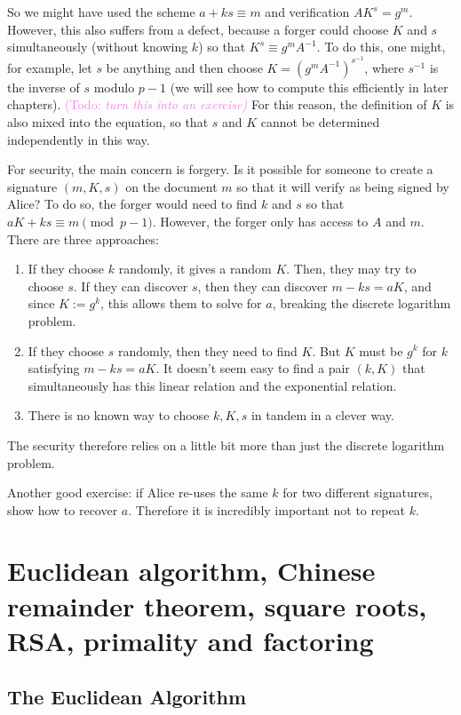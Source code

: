 \documentclass{article}
\theoremstyle{plain}
\theoremstyle{definition}
\theoremstyle{remark}
\numberwithin{theorem}{section}
\newcommand{\KS}[1]{\textcolor{violet}{{\sf (Todo:} {\sl{#1})}}}
\newcommand{\KS}[1]{}
\begin{document}
      So we might have used the scheme $a + ks \equiv m$ and verification $AK^s = g^m$.  However, this also suffers from a defect, because a forger could choose $K$ and $s$ simultaneously (without knowing $k$) so that $K^s \equiv g^mA^{-1}$.  To do this, one might, for example, let $s$ be anything and then choose $K = (g^mA^{-1})^{s^{-1}}$, where $s^{-1}$ is the inverse of $s$ modulo $p-1$ (we will see how to compute this efficiently in later chapters). \KS{turn this into an exercise}  For this reason, the definition of $K$ is also mixed into the equation, so that $s$ and $K$ cannot be determined independently in this way.

      For security, the main concern is forgery.  Is it possible for someone to create a signature $(m,K,s)$ on the document $m$ so that it will verify as being signed by Alice?  To do so, the forger would need to find $k$ and $s$ so that $aK+ks \equiv m \pmod{p-1}$.  However, the forger only has access to $A$ and $m$.  There are three approaches:

      \begin{enumerate}
	      \item If they choose $k$ randomly, it gives a random $K$.  Then, they may try to choose $s$.  If they can discover $s$, then they can discover $m-ks = aK$, and since $K := g^k$, this allows them to solve for $a$, breaking the discrete logarithm problem.
	      \item If they choose $s$ randomly, then they need to find $K$.  But $K$ must be $g^k$ for $k$ satisfying $m - ks = aK$.  It doesn't seem easy to find a pair $(k,K)$ that simultaneously has this linear relation and the exponential relation.
	      \item There is no known way to choose $k, K, s$ in tandem in a clever way.
      \end{enumerate}

      The security therefore relies on a little bit more than just the discrete logarithm problem.

      Another good exercise:  if Alice re-uses the same $k$ for two different signatures, show how to recover $a$.  Therefore it is incredibly important not to repeat $k$.

\section{Euclidean algorithm, Chinese remainder theorem, square roots, RSA, primality and factoring}

\subsection{The Euclidean Algorithm}
\end{document}
